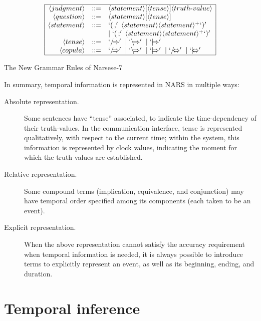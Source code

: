 \begin{table}[htb]
\[\begin{array}{|rrl|}
\hline
\langle judgment \rangle & ::= & \langle statement \rangle [\langle tense \rangle] \langle truth \mbox{-} value \rangle \\
\langle question \rangle & ::= & \langle statement \rangle [\langle tense \rangle] \\ 
\langle statement \rangle & ::= & `(\, ,' \; \langle statement \rangle \langle statement \rangle^+ `)' \\ &&
                  		 | \; `(\, ;' \; \langle statement \rangle \langle statement \rangle^+ `)' \\
\langle tense \rangle & ::= & `/\!\!\!\Rightarrow' \; | \; `\backslash\!\!\!\Rightarrow' \; | \; `|\!\!\!\Rightarrow' \\
\langle copula \rangle & ::= & `/\!\!\!\Rightarrow' \; | \; `\backslash\!\!\!\Rightarrow' \; | \; `|\!\!\!\Rightarrow' \;
                  		 | \; `/\!\!\!\Leftrightarrow' \; | \; `|\!\!\!\Leftrightarrow' \\ 
\hline
\end{array} \]
\caption{The New Grammar Rules of Narsese-7}
\label{Narsese-7}
\end{table}

In summary, temporal information is represented in NARS in multiple ways:
\begin{description}
	\item[Absolute representation.] Some sentences have ``tense'' associated, to indicate the time-dependency of their truth-values. In the communication interface, tense is represented qualitatively, with respect to the current time; within the system, this information is represented by clock values, indicating the moment for which the truth-values are established.
	\item[Relative representation.] Some compound terms (implication, equivalence, and conjunction) may have temporal order specified among its components (each taken to be an event). 
	\item[Explicit representation.] When the above representation cannot satisfy the accuracy requirement when temporal information is needed, it is always possible to introduce terms to explicitly represent an event, as well as its beginning, ending, and duration.
\end{description}


\section{Temporal inference}

